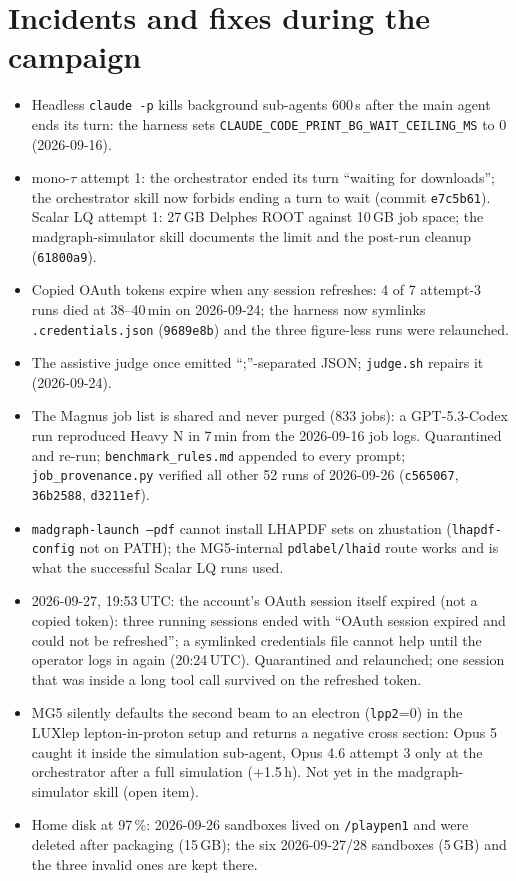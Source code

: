 \documentclass[10pt,a4paper]{article}
\newcommand{\code}[1]{\texttt{#1}}
\begin{document}
\section{Incidents and fixes during the campaign}
\begin{itemize}
\item Headless \code{claude -p} kills background sub-agents 600\,s after the main agent ends its turn: the harness sets \code{CLAUDE\_CODE\_PRINT\_BG\_WAIT\_CEILING\_MS} to 0 (2026-09-16).
\item mono-$\tau$ attempt 1: the orchestrator ended its turn ``waiting for downloads''; the orchestrator skill now forbids ending a turn to wait (commit \code{e7c5b61}). Scalar LQ attempt 1: 27\,GB Delphes ROOT against 10\,GB job space; the madgraph-simulator skill documents the limit and the post-run cleanup (\code{61800a9}).
\item Copied OAuth tokens expire when any session refreshes: 4 of 7 attempt-3 runs died at 38--40\,min on 2026-09-24; the harness now symlinks \code{.credentials.json} (\code{9689e8b}) and the three figure-less runs were relaunched.
\item The assistive judge once emitted ``;''-separated JSON; \code{judge.sh} repairs it (2026-09-24).
\item The Magnus job list is shared and never purged (833 jobs): a GPT-5.3-Codex run reproduced Heavy N in 7\,min from the 2026-09-16 job logs. Quarantined and re-run; \code{benchmark\_rules.md} appended to every prompt; \code{job\_provenance.py} verified all other 52 runs of 2026-09-26 (\code{c565067}, \code{36b2588}, \code{d3211ef}).
\item \code{madgraph-launch --pdf} cannot install LHAPDF sets on zhustation (\code{lhapdf-config} not on PATH); the MG5-internal \code{pdlabel/lhaid} route works and is what the successful Scalar LQ runs used.
\item 2026-09-27, 19:53\,UTC: the account's OAuth session itself expired (not a copied token): three running sessions ended with ``OAuth session expired and could not be refreshed''; a symlinked credentials file cannot help until the operator logs in again (20:24\,UTC). Quarantined and relaunched; one session that was inside a long tool call survived on the refreshed token.
\item MG5 silently defaults the second beam to an electron (\code{lpp2}=0) in the LUXlep lepton-in-proton setup and returns a negative cross section: Opus 5 caught it inside the simulation sub-agent, Opus 4.6 attempt 3 only at the orchestrator after a full simulation (+1.5\,h). Not yet in the madgraph-simulator skill (open item).
\item Home disk at 97\,\%: 2026-09-26 sandboxes lived on \code{/playpen1} and were deleted after packaging (15\,GB); the six 2026-09-27/28 sandboxes (5\,GB) and the three invalid ones are kept there.
\end{itemize}
\end{document}
